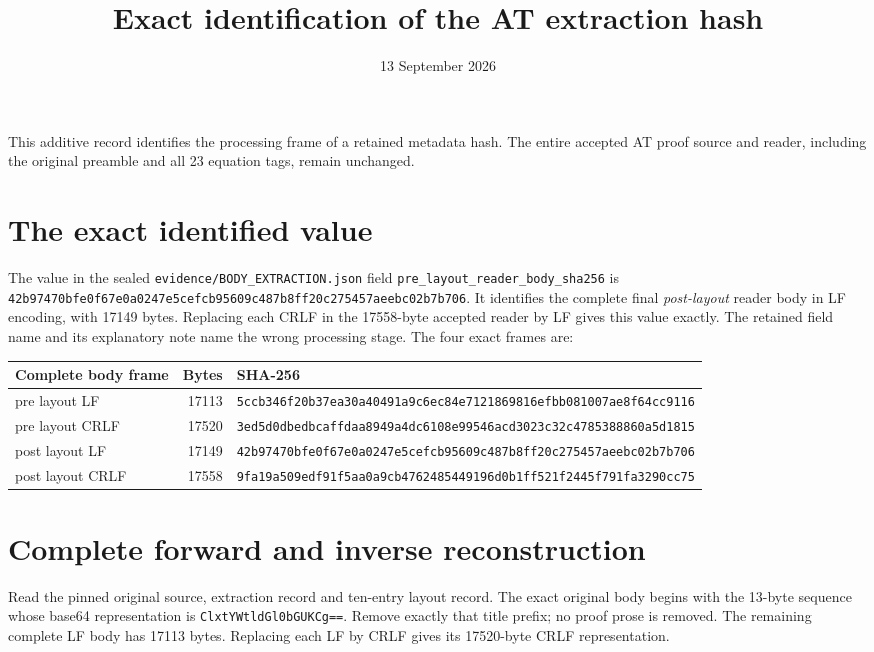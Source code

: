 \documentclass[11pt,a4paper]{article}
\title{Exact identification of the AT extraction hash}
\author{}
\date{13 September 2026}
\begin{document}
\maketitle
This additive record identifies the processing frame of a retained metadata
hash. The entire accepted AT proof source and reader, including the original
preamble and all 23 equation tags, remain unchanged.

\section{The exact identified value}
The value in the sealed
\nolinkurl{evidence/BODY_EXTRACTION.json} field
\nolinkurl{pre_layout_reader_body_sha256} is
\nolinkurl{42b97470bfe0f67e0a0247e5cefcb95609c487b8ff20c275457aeebc02b7b706}.
It identifies the complete final \emph{post-layout} reader body in LF
encoding, with 17149 bytes. Replacing each CRLF in the 17558-byte accepted
reader by LF gives this value exactly. The retained field name and its
explanatory note name the wrong processing stage. The four exact frames are:

\begin{longtable}{@{}p{.23\linewidth}r p{.57\linewidth}@{}}
\toprule Complete body frame & Bytes & SHA-256 \\
\midrule
pre layout LF & 17113 & \nolinkurl{5ccb346f20b37ea30a40491a9c6ec84e7121869816efbb081007ae8f64cc9116} \\
pre layout CRLF & 17520 & \nolinkurl{3ed5d0dbedbcaffdaa8949a4dc6108e99546acd3023c32c4785388860a5d1815} \\
post layout LF & 17149 & \nolinkurl{42b97470bfe0f67e0a0247e5cefcb95609c487b8ff20c275457aeebc02b7b706} \\
post layout CRLF & 17558 & \nolinkurl{9fa19a509edf91f5aa0a9cb4762485449196d0b1ff521f2445f791fa3290cc75} \\
\bottomrule
\end{longtable}

\section{Complete forward and inverse reconstruction}
Read the pinned original source, extraction record and ten-entry layout
record. The exact original body begins with the 13-byte sequence whose
base64 representation is \nolinkurl{ClxtYWtldGl0bGUKCg==}.
Remove exactly that title prefix; no proof prose is removed.
The remaining complete LF body has 17113 bytes. Replacing each LF by CRLF
gives its 17520-byte CRLF representation.
\end{document}
